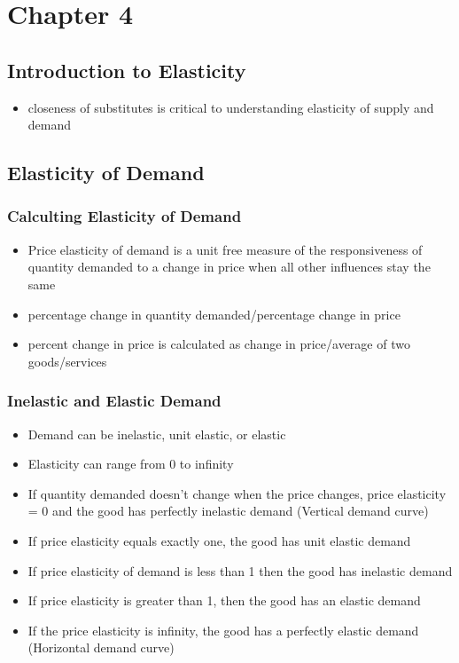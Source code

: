 \documentclass[11pt]{article}
\author{Sudhan Chitgopkar}
\date{\today}
\title{}
\begin{document}
\tableofcontents

\section{Chapter 4}
\label{sec:orgc482cd4}
\subsection{Introduction to Elasticity}
\label{sec:orga8925c2}
\begin{itemize}
\item closeness of substitutes is critical to understanding elasticity of supply and demand
\end{itemize}
\subsection{Elasticity of Demand}
\label{sec:org4464169}
\subsubsection{Calculting Elasticity of Demand}
\label{sec:orgeef631f}
\begin{itemize}
\item Price elasticity of demand is a unit free measure of the responsiveness of quantity 
demanded to a change in price when all other influences stay the same
\item percentage change in quantity demanded/percentage change in price
\item percent change in price is calculated as change in price/average of two goods/services
\end{itemize}
\subsubsection{Inelastic and Elastic Demand}
\label{sec:orgb59761a}
\begin{itemize}
\item Demand can be inelastic, unit elastic, or elastic
\item Elasticity can range from 0 to infinity
\item If quantity demanded doesn't change when the price changes, price elasticity = 0 and the good
has perfectly inelastic demand (Vertical demand curve)
\item If price elasticity equals exactly one, the good has unit elastic demand
\item If price elasticity of demand is less than 1 then the good has inelastic demand
\item If price elasticity is greater than 1, then the good has an elastic demand
\item If the price elasticity is infinity, the good has a perfectly 
elastic demand (Horizontal demand curve)
\end{itemize}
\end{document}
